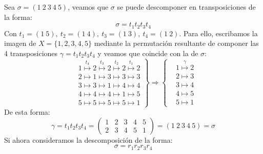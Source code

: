 \begin{ejemplo}
    Sea $\sigma = (1\ 2\ 3\ 4\ 5)$, veamos que $\sigma$ se puede descomponer en transposiciones de la forma:
    \begin{equation*}
        \sigma= t_1t_2t_3t_4
    \end{equation*}
    Con $t_1 = (1\ 5),\  t_2 = (1\ 4),\  t_3 = (1\ 3),\  t_4 = (1\ 2)$.\newline
    Para ello, escribamos la imagen de $X=\{1,2,3,4,5\}$ mediante la permutación resultante de componer las 4 transposiciones $\gamma=t_1t_2t_3t_4$ y veamos que coincide con la de $\sigma$:
    \begin{equation*}
        \left.\begin{array}{cc}
            &1 \stackrel{t_4}{\longmapsto} 2 \stackrel{t_3}{\longmapsto} 2 \stackrel{t_2}{\longmapsto} 2 \stackrel{t_1}{\longmapsto} 2 \\
            &2 \longmapsto 1 \longmapsto 3 \longmapsto 3 \longmapsto 3 \\
            &3 \longmapsto 3 \longmapsto 1 \longmapsto 4 \longmapsto 4 \\
            &4 \longmapsto 4 \longmapsto 4 \longmapsto 1 \longmapsto 5 \\
            &5 \longmapsto 5 \longmapsto 5 \longmapsto 5 \longmapsto 1 
        \end{array}\right\} \Longrightarrow 
        \left\{\begin{array}{cc}
            &1 \stackrel{\gamma}{\longmapsto} 2 \\
            &2 \longmapsto 3 \\
            &3 \longmapsto 4 \\
            &4 \longmapsto 5 \\
            &5 \longmapsto 1 
        \end{array}\right.
    \end{equation*}
    De esta forma:
    \begin{equation*}
        \gamma = t_1t_2t_3t_4 = \left(\begin{array}{ccccc}
            1 & 2 & 3 & 4 & 5 \\
            2 & 3 & 4 & 5 & 1 
        \end{array}\right) = (1\ 2\ 3\ 4\ 5) = \sigma
    \end{equation*}
    Si ahora consideramos la descomposición de la forma:
    \begin{equation*}
        \sigma = r_1r_2r_3r_4
    \end{equation*}

\end{ejemplo}
